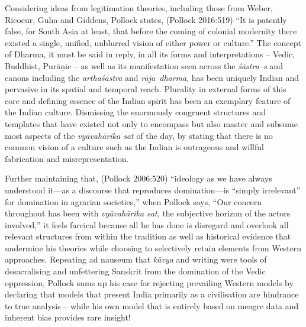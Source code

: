 Considering ideas from legitimation theories, including those from Weber, Ricoeur, Guha and Giddens, Pollock states, (Pollock 2016:519) “It is patently false, for South Asia at least, that before the coming of colonial modernity there existed a single, unified, unblurred vision of either power or culture.” The concept of Dharma, it must be said in reply, in all its forms and interpretations – Vedic, Buddhist, Purāṇic – as well as its manifestation seen across the \textit{śāstra–s} and canons including the \textit{arthaśāstra} and \textit{rāja–dharma}, has been uniquely Indian and pervasive in its spatial and temporal reach. Plurality in external forms of this core and defining essence of the Indian spirit has been an exemplary feature of the Indian culture. Dismissing the enormously congruent structures and templates that have existed not only to encompass but also master and subsume most aspects of the \textit{vyāvahārika sat} of the day, by stating that there is no common vision of a culture such as the Indian is outrageous and willful fabrication and misrepresentation.

Further maintaining that, (Pollock 2006:520) “ideology as we have always understood it—as a discourse that reproduces domination—is “simply irrelevant” for domination in agrarian societies,” when Pollock says, “Our concern throughout has been with \textit{vyāvahārika sat}, the subjective horizon of the actors involved,” it feels farcical because all he has done is disregard and overlook all relevant structures from within the tradition as well as historical evidence that undermine his theories while choosing to selectively retain elements from Western approaches. Repeating ad nauseum that \textit{kāvya} and writing were tools of desacralising and unfettering Sanskrit from the domination of the Vedic oppression, Pollock sums up his case for rejecting prevailing Western models by declaring that models that present India primarily as a civilisation are hindrance to true analysis – while his own model that is entirely based on meagre data and inherent bias provides rare insight!

